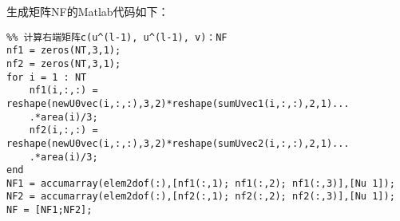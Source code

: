 \documentclass{ctexart}
\begin{document}
生成矩阵NF的Matlab代码如下：
\begin{lstlisting}
%% 计算右端矩阵c(u^(l-1), u^(l-1), v)：NF
nf1 = zeros(NT,3,1);
nf2 = zeros(NT,3,1);
for i = 1 : NT
    nf1(i,:,:) = reshape(newU0vec(i,:,:),3,2)*reshape(sumUvec1(i,:,:),2,1)...
    .*area(i)/3;
    nf2(i,:,:) = reshape(newU0vec(i,:,:),3,2)*reshape(sumUvec2(i,:,:),2,1)...
    .*area(i)/3;
end
NF1 = accumarray(elem2dof(:),[nf1(:,1); nf1(:,2); nf1(:,3)],[Nu 1]);
NF2 = accumarray(elem2dof(:),[nf2(:,1); nf2(:,2); nf2(:,3)],[Nu 1]);
NF = [NF1;NF2];
\end{lstlisting}
\end{document}
